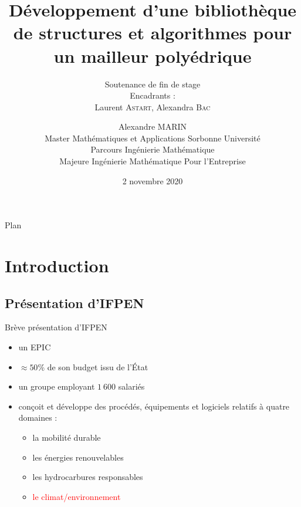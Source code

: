\documentclass[aspectratio=169, 12pt, a4paper, hyperref={pdfauthor={Alexandre MARIN}, pdfkeywords={IFPEN, Delaunay, Voronoi, mesh generation}, colorlinks=true, linkcolor=purple, urlcolor=blue, citecolor=magenta}]{beamer}
\begin{document}
\begin{frame}
\date{2 novembre 2020}
\author{\small Alexandre \textsc{MARIN}\\ { Master Mathématiques et Applications Sorbonne Université\\ Parcours Ingénierie Mathématique\\ Majeure Ingénierie Mathématique Pour l'Entreprise}}
\title{Développement d’une bibliothèque de structures et algorithmes pour un mailleur polyédrique}
\subtitle{\small Soutenance de fin de stage\\ Encadrants :\\ Laurent \textsc{Astart}, Alexandra \textsc{Bac}}
\maketitle
\end{frame}

\begin{Energie}{Plan}
\tableofcontents
\end{Energie}

\section{Introduction}

\subsection{Présentation d'IFPEN}
\begin{Energie}{Brève présentation d'IFPEN}
\begin{itemize}
\item un EPIC
\item $\approx 50$\% de son budget issu de l'\'Etat
\item un groupe employant $1\ 600$ salariés
\item conçoit et développe des procédés, équipements et logiciels relatifs à quatre domaines :
\begin{itemize}
\item la mobilité durable
\item les énergies renouvelables
\item les hydrocarbures responsables
\item \textcolor{red}{le climat/environnement}
\end{itemize}
\end{itemize}
\end{Energie}
\end{document}
